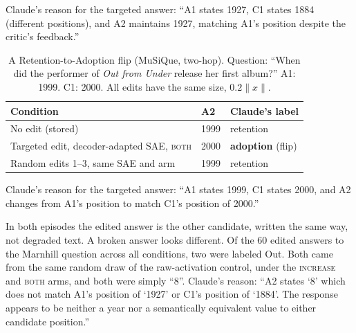 Claude's reason for the targeted answer: ``A1 states 1927, C1 states 1884
(different positions), and A2 maintains 1927, matching A1's position despite
the critic's feedback.''

\begin{table}[htbp]
    \centering
    \caption{A Retention-to-Adoption flip (MuSiQue, two-hop). Question: ``When
    did the performer of \emph{Out from Under} release her first album?'' A1:
    1999. C1: 2000. All edits have the same size, $0.2\lVert x\rVert$.}
    \label{tab:flip-r2a}
    \small
    \begin{tabular}{p{7.8cm}lp{2.8cm}}
        \toprule
        Condition & A2 & Claude's label \tabularnewline
        \midrule
        No edit (stored) & 1999 & retention \tabularnewline
        Targeted edit, decoder-adapted SAE, \textsc{both} & 2000 & \textbf{adoption} (flip) \tabularnewline
        Random edits 1--3, same SAE and arm & 1999 & retention \tabularnewline
        \bottomrule
    \end{tabular}
\end{table}

Claude's reason for the targeted answer: ``A1 states 1999, C1 states 2000,
and A2 changes from A1's position to match C1's position of 2000.''

In both episodes the edited answer is the other candidate, written the same
way, not degraded text. A broken answer looks different. Of the 60 edited
answers to the Marnhill question across all conditions, two were labeled
Out. Both came from the same random draw of the raw-activation control, under
the \textsc{increase} and \textsc{both} arms, and both were simply ``8''.
Claude's reason: ``A2 states `8' which does not match A1's position of `1927'
or C1's position of `1884'. The response appears to be neither a year nor a
semantically equivalent value to either candidate position.''
